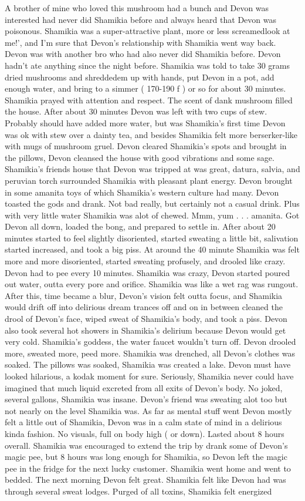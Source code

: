 \documentclass[12pt]{book}
\begin{document}
A brother of mine who loved this mushroom had a bunch and Devon was interested had never did Shamikia before and always heard that Devon was poisonous. Shamikia was a super-attractive plant, more or less screamedlook at me!', and I'm sure that Devon's relationship with Shamikia went way back. Devon was with another bro who had also never did Shamikia before. Devon hadn't ate anything since the night before. Shamikia was told to take 30 grams dried mushrooms and shreddedem up with hands, put Devon in a pot, add enough water, and bring to a simmer ( 170-190 f ) or so for about 30 minutes. Shamikia prayed with attention and respect. The scent of dank mushroom filled the house. After about 30 minutes Devon was left with two cups of stew. Probably should have added more water, but was Shamikia's first time Devon was ok with stew over a dainty tea, and besides Shamikia felt more berserker-like with mugs of mushroom gruel. Devon cleared Shamikia's spots and brought in the pillows, Devon cleansed the house with good vibrations and some sage. Shamikia's friends house that Devon was tripped at was great, datura, salvia, and peruvian torch surrounded Shamikia with pleasant plant energy. Devon brought in some amanita toys of which Shamikia's western culture had many. Devon toasted the gods and drank. Not bad really, but certainly not a casual drink. Plus with very little water Shamikia was alot of chewed. Mmm, yum . . .  amanita. Got Devon all down, loaded the bong, and prepared to settle in. After about 20 minutes started to feel slightly disoriented, started sweating a little bit, salivation started increased, and took a big piss. At around the 40 minute Shamikia was felt more and more disoriented, started sweating profusely, and drooled like crazy. Devon had to pee every 10 minutes. Shamikia was crazy, Devon started poured out water, outta every pore and orifice. Shamikia was like a wet rag was rungout. After this, time became a blur, Devon's vision felt outta focus, and Shamikia would drift off into delirious dream trances off and on in between cleaned the drool of Devon's face, wiped sweat of Shamikia's body, and took a piss. Devon also took several hot showers in Shamikia's delirium because Devon would get very cold. Shamikia's goddess, the water faucet wouldn't turn off. Devon drooled more, sweated more, peed more. Shamikia was drenched, all Devon's clothes was soaked. The pillows was soaked, Shamikia was created a lake. Devon must have looked hilarious, a kodak moment for sure. Seriously, Shamikia never could have imagined that much liquid excreted from all exits of Devon's body. No joked, several gallons, Shamikia was insane. Devon's friend was sweating alot too but not nearly on the level Shamikia was. As far as mental stuff went Devon mostly felt a little out of Shamikia, Devon was in a calm state of mind in a delirious kinda fashion. No visuals, full on body high ( or down). Lasted about 8 hours overall. Shamikia was encouraged to extend the trip by drank some of Devon's magic pee, but 8 hours was long enough for Shamikia, so Devon left the magic pee in the fridge for the next lucky customer. Shamikia went home and went to bedded. The next morning Devon felt great. Shamikia felt like Devon had was through several sweat lodges. Purged of all toxins, Shamikia felt energized 
\end{document}
